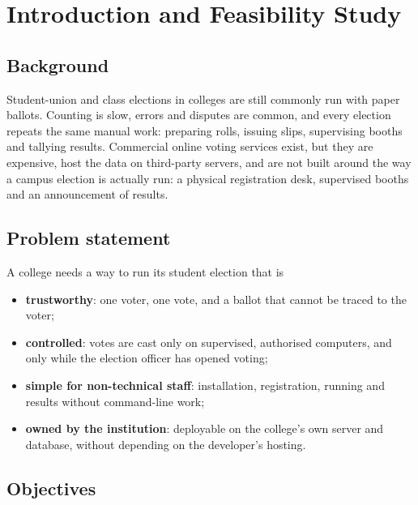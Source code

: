 \chapter{Introduction and Feasibility Study}
\label{chap:intro}

\section{Background}

Student-union and class elections in colleges are still commonly run with paper ballots. Counting is slow, errors and disputes are common, and every election repeats the same manual work: preparing rolls, issuing slips, supervising booths and tallying results. Commercial online voting services exist, but they are expensive, host the data on third-party servers, and are not built around the way a campus election is actually run: a physical registration desk, supervised booths and an announcement of results.

\section{Problem statement}

A college needs a way to run its student election that is

\begin{itemize}
  \item \textbf{trustworthy}: one voter, one vote, and a ballot that cannot be traced to the voter;
  \item \textbf{controlled}: votes are cast only on supervised, authorised computers, and only while the election officer has opened voting;
  \item \textbf{simple for non-technical staff}: installation, registration, running and results without command-line work;
  \item \textbf{owned by the institution}: deployable on the college's own server and database, without depending on the developer's hosting.
\end{itemize}

\section{Objectives}

